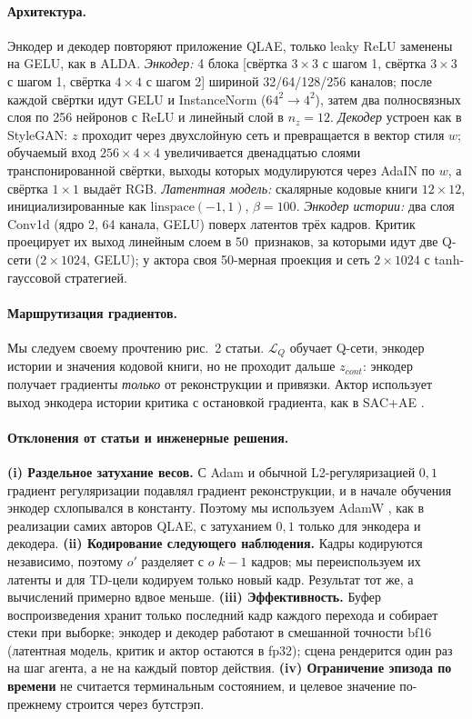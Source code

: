 \documentclass{article}
\theoremstyle{plain}
\theoremstyle{definition}
\theoremstyle{remark}
\begin{document}
\paragraph{Архитектура.} Энкодер и декодер повторяют приложение QLAE, только
leaky ReLU заменены на GELU, как в ALDA. \emph{Энкодер:} 4 блока [свёртка
$3{\times}3$ с шагом 1, свёртка $3{\times}3$ с шагом 1, свёртка $4{\times}4$ с
шагом 2] шириной 32/64/128/256 каналов; после каждой свёртки идут GELU и
InstanceNorm ($64^2\!\to\!4^2$), затем два полносвязных слоя по 256 нейронов с
ReLU и линейный слой в $n_z{=}12$. \emph{Декодер} устроен как в StyleGAN: $z$
проходит через двухслойную сеть и превращается в вектор стиля $w$; обучаемый
вход $256{\times}4{\times}4$ увеличивается двенадцатью слоями транспонированной
свёртки, выходы которых модулируются через AdaIN по $w$, а свёртка
$1{\times}1$ выдаёт RGB. \emph{Латентная модель:} скалярные кодовые книги
$12{\times}12$, инициализированные как $\mathrm{linspace}(-1,1)$, $\beta{=}100$.
\emph{Энкодер истории:} два слоя Conv1d (ядро 2, 64 канала, GELU) поверх
латентов трёх кадров. Критик проецирует их выход линейным слоем в
50~признаков, за которыми идут две Q-сети ($2{\times}1024$, GELU); у актора
своя 50-мерная проекция и сеть $2{\times}1024$ с tanh-гауссовой стратегией.

\paragraph{Маршрутизация градиентов.} Мы следуем своему прочтению рис.~2
статьи. $\mathcal{L}_Q$ обучает Q-сети, энкодер истории и значения кодовой
книги, но не проходит дальше $z_{cont}$: энкодер получает градиенты
\emph{только} от реконструкции и привязки. Актор использует выход энкодера
истории критика с остановкой градиента, как в SAC+AE \citep{yarats2021sacae}.

\paragraph{Отклонения от статьи и инженерные решения.}
\textbf{(i) Раздельное затухание весов.} С Adam и обычной L2-регуляризацией
$0,1$ градиент регуляризации подавлял градиент реконструкции, и в начале
обучения энкодер схлопывался в константу. Поэтому мы используем AdamW
\citep{loshchilov2019adamw}, как в реализации самих авторов QLAE, с затуханием
$0,1$ только для энкодера и декодера.
\textbf{(ii) Кодирование следующего наблюдения.} Кадры кодируются
независимо, поэтому $o'$ разделяет с $o$ $k{-}1$ кадров; мы переиспользуем их
латенты и для TD-цели кодируем только новый кадр. Результат тот же, а
вычислений примерно вдвое меньше.
\textbf{(iii) Эффективность.} Буфер воспроизведения хранит только последний
кадр каждого перехода и собирает стеки при выборке; энкодер и декодер
работают в смешанной точности bf16 (латентная модель, критик и актор
остаются в fp32); сцена рендерится один раз на шаг агента, а не на каждый
повтор действия.
\textbf{(iv) Ограничение эпизода по времени} не считается терминальным
состоянием, и целевое значение по-прежнему строится через бутстрэп.
\end{document}
